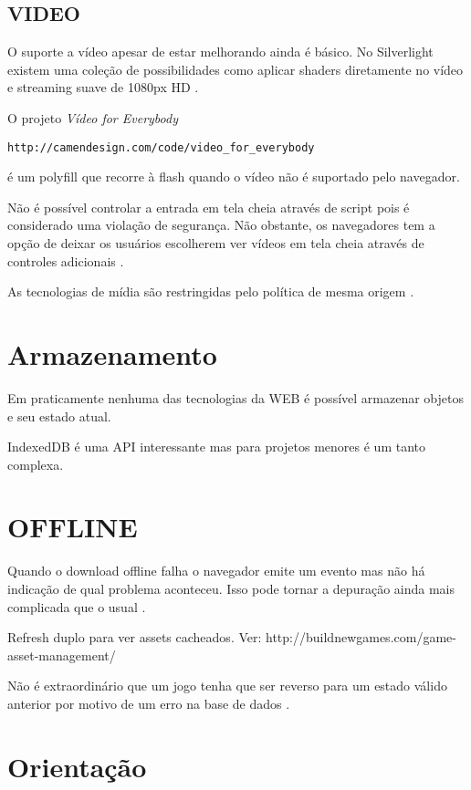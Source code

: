 \begin{draft}
\subsection{VIDEO}

O suporte a vídeo apesar de estar melhorando ainda é básico. No
Silverlight existem uma coleção de possibilidades como aplicar shaders
diretamente no vídeo e streaming suave de 1080px HD \autocite[pp.
8]{researchOnHtml}.

O projeto \textit{Vídeo for Everybody} \begin{verbatim}
http://camendesign.com/code/video_for_everybody \end{verbatim} é um
polyfill que recorre à flash quando o vídeo não é suportado pelo
navegador.

Não é possível controlar a entrada em tela cheia através de script pois 
é considerado uma violação de segurança. Não obstante, os navegadores
tem a opção de deixar os usuários escolherem ver vídeos em tela cheia
através de  controles adicionais \autocite[pp. 68]{proHtml5}.

As tecnologias de mídia são restringidas pelo política de mesma origem \autocite[pp. 68]{proHtml5}.

\section{Armazenamento}

Em praticamente nenhuma das tecnologias da WEB é possível armazenar objetos e  seu estado atual.

IndexedDB é uma API interessante mas para projetos menores é um tanto complexa.

\section{OFFLINE}

Quando o download offline falha o navegador emite um evento mas não há
indicação de qual problema aconteceu. Isso pode tornar a depuração
ainda mais complicada que o usual \autocite{diveIntohtml}.

Refresh duplo para ver assets cacheados. Ver:
http://buildnewgames.com/game-asset-management/

Não é extraordinário que um jogo tenha que ser reverso para um estado
válido anterior por motivo de um erro na base de dados \autocite[pp.
5]{browserGamesTechnologyAndFuture}.


\section{Orientação}


\end{draft}
